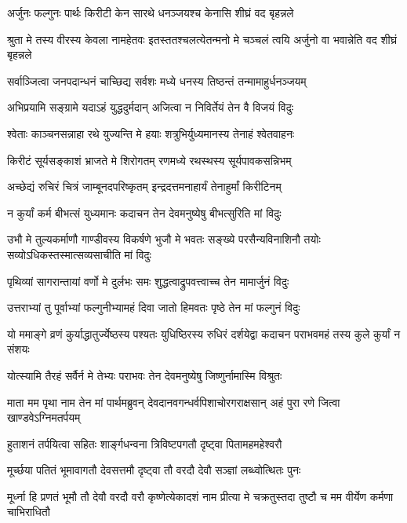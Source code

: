 \twolineshloka
{अर्जुनः फल्गुनः पार्थः किरीटी केन सारथे}
{धनञ्जयश्च केनासि शीघ्रं वद बृहन्नले}


\threelineshloka
{श्रुता मे तस्य वीरस्य केवला नामहेतवः}
{इतस्ततश्चलत्येतन्मनो मे चञ्चलं त्वयि}
{अर्जुनो वा भवान्नेति वद शीघ्रं बृहन्नले}




\twolineshloka
{सर्वाञ्जित्वा जनपदान्धनं चाच्छिद्य सर्वशः}
{मध्ये धनस्य तिष्ठन्तं तन्मामाहुर्धनञ्जयम्}


\twolineshloka
{अभिप्रयामि सङ्ग्रामे यदाऽहं युद्धदुर्मदान्}
{अजित्वा न निविर्तेयं तेन वै विजयं विदुः}


\twolineshloka
{श्वेताः काञ्चनसन्नाहा रथे युज्यन्ति मे हयाः}
{शत्रुभिर्युध्यमानस्य तेनाहं श्वेतवाहनः}


\twolineshloka
{किरीटं सूर्यसङ्काशं भ्राजते मे शिरोगतम्}
{रणमध्ये रथस्थस्य सूर्यपावकसन्निभम्}


\twolineshloka
{अच्छेद्यं रुचिरं चित्रं जाम्बूनदपरिष्कृतम्}
{इन्द्रदत्तमनाहार्यं तेनाहुर्मां किरीटिनम्}


\twolineshloka
{न कुर्यां कर्म बीभत्सं युध्यमानः कदाचन}
{तेन देवमनुष्येषु बीभत्सुरिति मां विदुः}


\threelineshloka
{उभौ मे तुल्यकर्माणौ गाण्डीवस्य विकर्षणे}
{भुजौ मे भवतः सङ्ख्ये परसैन्यविनाशिनौ}
{तयोः सव्योऽधिकस्तस्मात्सव्यसाचीति मां विदुः}


\twolineshloka
{पृथिव्यां सागरान्तायां वर्णो मे दुर्लभः समः}
{शुद्धत्वाद्रुपवत्त्वाच्च तेन मामार्जुनं विदुः}


\twolineshloka
{उत्तराभ्यां तु पूर्वाभ्यां फल्गुनीभ्यामहं दिवा}
{जातो हिमवतः पृष्ठे तेन मां फल्गुनं विदुः}


\threelineshloka
{यो ममाङ्गे व्रणं कुर्याद्धातुर्ज्येष्ठस्य पश्यतः}
{युधिष्ठिरस्य रुधिरं दर्शयेद्वा कदाचन}
{पराभवमहं तस्य कुले कुर्यां न संशयः}


\twolineshloka
{योत्स्यामि तैरहं सर्वैर्न मे तेभ्यः पराभवः}
{तेन देवमनुष्येषु जिष्णुर्नामास्मि विश्रुतः}


\onelineshloka
{माता मम पृथा नाम तेन मां पार्थमब्रुवन्}
\twolineshloka
{देवदानवगन्धर्वपिशाचोरगराक्षसान्}
{अहं पुरा रणे जित्वा खाण्डवेऽग्निमतर्पयम्}


\twolineshloka
{हुताशनं तर्पयित्वा सहितः शार्ङ्गधन्वना}
{त्रिविष्टपगतौ दृष्ट्वा पितामहमहेश्वरौ}


\twolineshloka
{मूर्च्छया पतितं भूमावागतौ देवसत्तमौ}
{दृष्ट्वा तौ वरदौ देवौ सञ्ज्ञां लब्ध्वोत्थितः पुनः}


\threelineshloka
{मूर्ध्ना हि प्रणतं भूमौ तौ देवौ वरदौ वरौ}
{कृष्णेत्येकादशं नाम प्रीत्या मे चक्रतुस्तदा}
{तुष्टौ च मम वीर्येण कर्मणा चाभिराधितौ}


